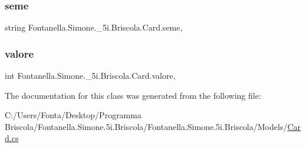 \subsubsection{\texorpdfstring{seme}{seme}}
{\footnotesize\ttfamily string Fontanella.\+Simone.\+\_\+5i.\+Briscola.\+Card.\+seme\hspace{0.3cm}{\ttfamily [get]}, {\ttfamily [set]}}

\hypertarget{class_fontanella_1_1_simone_1_1__5i_1_1_briscola_1_1_card_a0f375e6265e37cf5a126337790237ebe}{}\label{class_fontanella_1_1_simone_1_1__5i_1_1_briscola_1_1_card_a0f375e6265e37cf5a126337790237ebe} 
\subsubsection{\texorpdfstring{valore}{valore}}
{\footnotesize\ttfamily int Fontanella.\+Simone.\+\_\+5i.\+Briscola.\+Card.\+valore\hspace{0.3cm}{\ttfamily [get]}, {\ttfamily [set]}}



The documentation for this class was generated from the following file\+:\begin{DoxyCompactItemize}
\item 
C\+:/\+Users/\+Fonta/\+Desktop/\+Programma Briscola/\+Fontanella.\+Simone.\+5i.\+Briscola/\+Fontanella.\+Simone.\+5i.\+Briscola/\+Models/\hyperlink{_card_8cs}{Card.\+cs}\end{DoxyCompactItemize}
